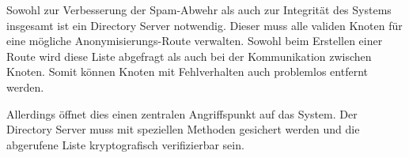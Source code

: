 Sowohl zur Verbesserung der Spam-Abwehr als auch zur Integrität des Systems insgesamt ist ein Directory Server notwendig. Dieser muss alle validen Knoten für eine mögliche Anonymisierungs-Route verwalten. Sowohl beim Erstellen einer Route wird diese Liste abgefragt als auch bei der Kommunikation zwischen Knoten.
Somit können Knoten mit Fehlverhalten auch problemlos entfernt werden.

Allerdings öffnet dies einen zentralen Angriffspunkt auf das System. Der Directory Server muss mit speziellen Methoden gesichert werden und die abgerufene Liste kryptografisch verifizierbar sein.